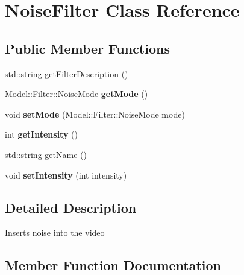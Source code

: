 \hypertarget{classModel_1_1Filter_1_1NoiseFilter}{}\section{Noise\+Filter Class Reference}
\label{classModel_1_1Filter_1_1NoiseFilter}
\subsection*{Public Member Functions}
\begin{DoxyCompactItemize}
\item 
std\+::string \hyperlink{classModel_1_1Filter_1_1NoiseFilter_a2b3f7d8fcd3d774b4a2fde5914a9729f}{get\+Filter\+Description} ()
\item 
\hypertarget{classModel_1_1Filter_1_1NoiseFilter_a8cf1af8c1df3a0e626fbd81dd18563e3}{}Model\+::\+Filter\+::\+Noise\+Mode {\bfseries get\+Mode} ()\label{classModel_1_1Filter_1_1NoiseFilter_a8cf1af8c1df3a0e626fbd81dd18563e3}

\item 
\hypertarget{classModel_1_1Filter_1_1NoiseFilter_aa89a05210654576ff0a5b5fcf97d03b0}{}void {\bfseries set\+Mode} (Model\+::\+Filter\+::\+Noise\+Mode mode)\label{classModel_1_1Filter_1_1NoiseFilter_aa89a05210654576ff0a5b5fcf97d03b0}

\item 
\hypertarget{classModel_1_1Filter_1_1NoiseFilter_a708995fb1b6acb31ee0dfb0f4881e5b5}{}int {\bfseries get\+Intensity} ()\label{classModel_1_1Filter_1_1NoiseFilter_a708995fb1b6acb31ee0dfb0f4881e5b5}

\item 
std\+::string \hyperlink{classModel_1_1Filter_1_1NoiseFilter_ac0fc966d4386ddb71d99361e3fccb311}{get\+Name} ()
\item 
\hypertarget{classModel_1_1Filter_1_1NoiseFilter_ac8255ffbc46bb61acaa8fd23d0d260eb}{}void {\bfseries set\+Intensity} (int intensity)\label{classModel_1_1Filter_1_1NoiseFilter_ac8255ffbc46bb61acaa8fd23d0d260eb}

\end{DoxyCompactItemize}


\subsection{Detailed Description}
Inserts noise into the video 

\subsection{Member Function Documentation}
\hypertarget{classModel_1_1Filter_1_1NoiseFilter_a2b3f7d8fcd3d774b4a2fde5914a9729f}{}
